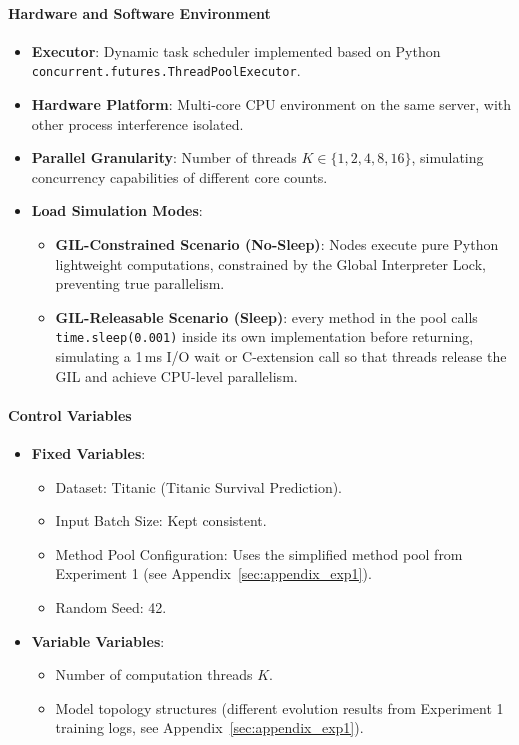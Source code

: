 \paragraph{Hardware and Software Environment}
\begin{itemize}
    \item \textbf{Executor}: Dynamic task scheduler implemented based on Python \texttt{concurrent.futures.ThreadPoolExecutor}.
    \item \textbf{Hardware Platform}: Multi-core CPU environment on the same server, with other process interference isolated.
    \item \textbf{Parallel Granularity}: Number of threads $K \in \{1, 2, 4, 8, 16\}$, simulating concurrency capabilities of different core counts.
    \item \textbf{Load Simulation Modes}:
    \begin{itemize}
        \item \textbf{GIL-Constrained Scenario (No-Sleep)}: Nodes execute pure Python lightweight computations, constrained by the Global Interpreter Lock, preventing true parallelism.
        \item \textbf{GIL-Releasable Scenario (Sleep)}: every method in the pool calls \texttt{time.sleep(0.001)} inside its own implementation before returning, simulating a 1\,ms I/O wait or C-extension call so that threads release the GIL and achieve CPU-level parallelism.
    \end{itemize}
\end{itemize}

\paragraph{Control Variables}
\begin{itemize}
    \item \textbf{Fixed Variables}:
    \begin{itemize}
        \item Dataset: Titanic (Titanic Survival Prediction).
        \item Input Batch Size: Kept consistent.
        \item Method Pool Configuration: Uses the simplified method pool from Experiment 1 (see Appendix~\ref{sec:appendix_exp1}).
        \item Random Seed: 42.
    \end{itemize}
    \item \textbf{Variable Variables}:
    \begin{itemize}
        \item Number of computation threads $K$.
        \item Model topology structures (different evolution results from Experiment 1 training logs, see Appendix~\ref{sec:appendix_exp1}).
    \end{itemize}
\end{itemize}

